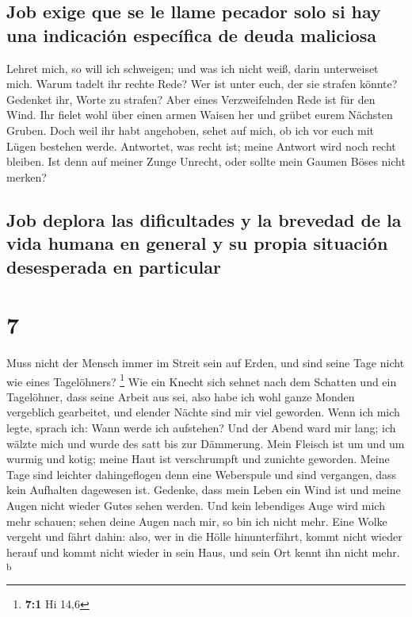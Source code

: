 \hypertarget{job-exige-que-se-le-llame-pecador-solo-si-hay-una-indicaciuxf3n-especuxedfica-de-deuda-maliciosa}{%
\subsection{Job exige que se le llame pecador solo si hay una indicación
específica de deuda
maliciosa}\label{job-exige-que-se-le-llame-pecador-solo-si-hay-una-indicaciuxf3n-especuxedfica-de-deuda-maliciosa}}

 Lehret mich, so will ich schweigen; und was ich nicht
weiß, darin unterweiset mich.  Warum tadelt ihr rechte
Rede? Wer ist unter euch, der sie strafen könnte? 
Gedenket ihr, Worte zu strafen? Aber eines Verzweifelnden Rede ist für
den Wind.  Ihr fielet wohl über einen armen Waisen her
und grübet eurem Nächsten Gruben.  Doch weil ihr habt
angehoben, sehet auf mich, ob ich vor euch mit Lügen bestehen werde.
 Antwortet, was recht ist; meine Antwort wird noch recht
bleiben.  Ist denn auf meiner Zunge Unrecht, oder sollte
mein Gaumen Böses nicht merken?

\hypertarget{job-deplora-las-dificultades-y-la-brevedad-de-la-vida-humana-en-general-y-su-propia-situaciuxf3n-desesperada-en-particular}{%
\subsection{Job deplora las dificultades y la brevedad de la vida humana
en general y su propia situación desesperada en
particular}\label{job-deplora-las-dificultades-y-la-brevedad-de-la-vida-humana-en-general-y-su-propia-situaciuxf3n-desesperada-en-particular}}

\hypertarget{section-6}{%
\section{7}\label{section-6}}

 Muss nicht der Mensch immer im Streit sein auf Erden, und
sind seine Tage nicht wie eines Tagelöhners? \footnote{\textbf{7:1} Hi
  14,6}  Wie ein Knecht sich sehnet nach dem Schatten und
ein Tagelöhner, dass seine Arbeit aus sei,  also habe ich
wohl ganze Monden vergeblich gearbeitet, und elender Nächte sind mir
viel geworden.  Wenn ich mich legte, sprach ich: Wann
werde ich aufstehen? Und der Abend ward mir lang; ich wälzte mich und
wurde des satt bis zur Dämmerung.  Mein Fleisch ist um und
um wurmig und kotig; meine Haut ist verschrumpft und zunichte geworden.
 Meine Tage sind leichter dahingeflogen denn eine
Weberspule und sind vergangen, dass kein Aufhalten dagewesen ist.
 Gedenke, dass mein Leben ein Wind ist und meine Augen
nicht wieder Gutes sehen werden.  Und kein lebendiges Auge
wird mich mehr schauen; sehen deine Augen nach mir, so bin ich nicht
mehr.  Eine Wolke vergeht und fährt dahin: also, wer in
die Hölle hinunterfährt, kommt nicht wieder herauf  und
kommt nicht wieder in sein Haus, und sein Ort kennt ihn nicht mehr.
\textsuperscript{b}

